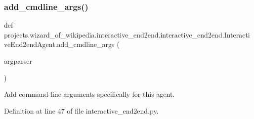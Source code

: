 \subsubsection{\texorpdfstring{add\+\_\+cmdline\+\_\+args()}{add\_cmdline\_args()}}
{\footnotesize\ttfamily def projects.\+wizard\+\_\+of\+\_\+wikipedia.\+interactive\+\_\+end2end.\+interactive\+\_\+end2end.\+Interactive\+End2end\+Agent.\+add\+\_\+cmdline\+\_\+args (\begin{DoxyParamCaption}\item[{}]{argparser }\end{DoxyParamCaption})\hspace{0.3cm}{\ttfamily [static]}}

\begin{DoxyVerb}Add command-line arguments specifically for this agent.
\end{DoxyVerb}
 

Definition at line 47 of file interactive\+\_\+end2end.\+py.


